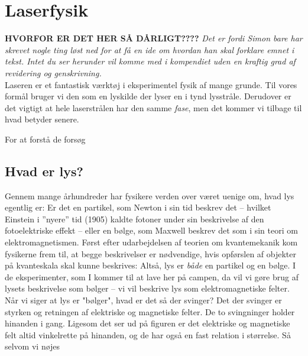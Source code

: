 \documentclass[crop=false, class=memoir]{standalone}
\begin{document}
\chapter{Laserfysik}

\textbf{HVORFOR ER DET HER SÅ DÅRLIGT????} \textit{Det er fordi Simon bare har skrevet nogle ting løst ned for at få en ide om hvordan han skal forklare emnet i tekst. Intet du ser herunder vil komme med i kompendiet uden en kraftig grad af revidering og genskrivning.}\\

Laseren er et fantastisk værktøj i eksperimentel fysik af mange grunde. Til vores formål bruger vi den som en lyskilde der lyser en i tynd lysstråle.  Derudover er det vigtigt at hele laserstrålen har den samme \textit{fase}, men det kommer vi tilbage til hvad betyder senere.

For at forstå de forsøg 


\section{Hvad er lys?}

Gennem mange århundreder har fysikere verden over været uenige om, hvad lys egentlig er: Er det en partikel, som Newton i sin tid beskrev det -- hvilket Einstein i ''nyere'' tid (1905) kaldte fotoner under sin beskrivelse af den fotoelektriske effekt -- eller en bølge, som Maxwell beskrev det som i sin teori om elektromagnetismen. Først efter udarbejdelsen af teorien om kvantemekanik kom fysikerne frem til, at begge beskrivelser er nødvendige, hvis opførslen af objekter på kvanteskala skal kunne beskrives: Altså, lys er \textit{både} en partikel og en bølge. I de eksperimenter, som I kommer til at lave her på campen, da vil vi gøre brug af lysets beskrivelse som bølger -- vi vil beskrive lys som elektromagnetiske felter.\\

Når vi siger at lys er "bølger", hvad er det så der svinger? Det der svinger er styrken og retningen af elektriske og magnetiske felter. De to svingninger holder hinanden i gang. Ligesom det ser ud på figuren er det elektriske og magnetiske felt altid vinkelrette på hinanden, og de har også en fast relation i størrelse. Så selvom vi nøjes 
\end{document}
